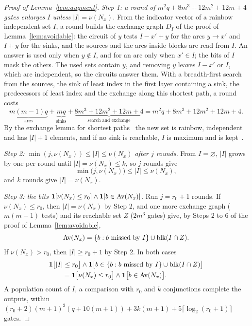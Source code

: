 \begin{proof}[Proof of Lemma~\ref{lem:augment}]
\emph{Step 1: a round of $m^{2}q+8m^{3}+12m^{2}+12m+4$ gates enlarges $I$ unless $|I|=\nu(N_x)$.}  From the indicator vector of a rainbow independent set
$I$, a round builds the exchange graph $D_I$ of the proof of
Lemma~\ref{lem:avoidable}: the circuit of $y$ tests $I-x'+y$ for the arcs
$y\to x'$ and $I+y$ for the sinks, and the sources and the arcs inside blocks are
read from $I$.  An answer is used only when $y\notin I$, and for an arc only when
$x'\in I$; the bits of $I$ mask the others.  The used sets contain $y$, and
removing $y$ leaves $I-x'$ or $I$, which are independent, so the circuits answer
them.  With a breadth-first search from the sources, the sink of least index in
the first layer containing a sink, the predecessors of least index and the
exchange along this shortest path, a round costs
\[
  \underbrace{m(m-1)q}_{\text{arcs}}+\underbrace{mq}_{\text{sinks}}
  +\underbrace{8m^{3}+12m^{2}+12m+4}_{\text{search and exchange}}
  =m^{2}q+8m^{3}+12m^{2}+12m+4.
\]
By the exchange lemma for shortest paths~\cite{schrijver03} the new set is
rainbow, independent and has $|I|+1$ elements, and if no sink is reachable, $I$
is maximum and is kept~\cite{lawler75,schrijver03}.

\emph{Step 2: $\min(j,\nu(N_x))\le|I|\le\nu(N_x)$ after $j$ rounds.}  From $I=\varnothing$, $|I|$ grows by one per round
until $|I|=\nu(N_x)\le k$, so $j$ rounds give
\[
  \min\bigl(j,\nu(N_x)\bigr)\le|I|\le\nu(N_x),
\]
and $k$ rounds give $|I|=\nu(N_x)$.

\emph{Step 3: the bits $\mathbf 1[\nu(N_x)\le r_0]\wedge\mathbf 1[b\in\operatorname{Av}(N_x)]$.}  Run $j=r_0+1$ rounds.  If $\nu(N_x)\le r_0$, then
$|I|=\nu(N_x)$ by Step 2, and one more exchange graph ($m(m-1)$ tests) and its
reachable set $Z$ ($2m^{3}$ gates) give, by Steps 2 to 6 of the proof of
Lemma~\ref{lem:avoidable},
\[
  \operatorname{Av}(N_x)=\{b:b\text{ missed by }I\}\cup\operatorname{blk}(I\cap Z).
\]
If $\nu(N_x)>r_0$, then $|I|\ge r_0+1$ by Step 2.  In both cases
\[
  \begin{aligned}
  &\mathbf 1\bigl[|I|\le r_0\bigr]\wedge\mathbf 1\bigl[b\in\{b:b\text{ missed by }I\}\cup\operatorname{blk}(I\cap Z)\bigr]\\
  &\qquad=\mathbf 1\bigl[\nu(N_x)\le r_0\bigr]\wedge\mathbf 1\bigl[b\in\operatorname{Av}(N_x)\bigr].
  \end{aligned}
\]
A population count of $I$, a comparison with $r_0$ and $k$ conjunctions complete
the outputs, within
$(r_0+2)(m+1)^{2}(q+10(m+1))+3k(m+1)+5\lceil\log_2(r_0+1)\rceil$ gates.
\end{proof}

